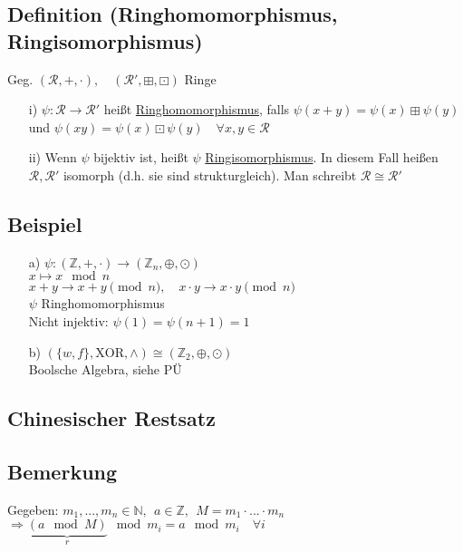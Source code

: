 \documentclass[a4paper, 12pt,titlepage, pdf, headsepline]{article}
\newcommand{\uline}[1]{\underline{#1}}
\renewcommand{\>}{\rightarrow}
\renewcommand{\*}{\cdot}
\begin{document}
	      \subsection{Definition (Ringhomomorphismus, Ringisomorphismus)}
	      Geg. $(\mathcal{R}, + , \cdot),\quad (\mathcal{R}', \boxplus, \boxdot)$  Ringe
	      \begin{itemize}
	      	\item[i)]$\psi: \mathcal{R} \rightarrow \mathcal{R}'$ heißt \uline{Ringhomomorphismus}, falls $\psi(x+y) = \psi(x) \boxplus \psi(y)$ und $\psi(xy)= \psi(x) \boxdot \psi(y)\quad \forall x,y \in \mathcal{R}$
	      	\item[ii)] Wenn $\psi$ bijektiv ist, heißt $\psi$ \uline{Ringisomorphismus}. In diesem Fall heißen $\mathcal{R}, \mathcal{R}'$ isomorph (d.h. sie sind strukturgleich). Man schreibt $\mathcal{R} \cong \mathcal{R}'$
	      \end{itemize}
	      	
	      \subsection{Beispiel}
	      \begin{itemize}
	      	\item[a)] $\psi: (\mathds{Z}, + ,\cdot) \rightarrow (\mathds{Z}_n,\oplus, \odot)$\\
	      	      \noindent\hspace*{17mm}$x \mapsto x \mod n$\\
	      	      $x +y \rightarrow x+y \pmod{n},\quad x \cdot y \rightarrow x \cdot y \pmod{n}$\\
	      	      $\psi$ Ringhomomorphismus\\
	      	      Nicht injektiv: $\psi(1)=\psi(n+1)=1$
	      	\item[b)]  $(\{w,f\}, \text{XOR}, \land) \cong (\mathds{Z}_2, \oplus, \odot)$\\
	      	      Boolsche Algebra, siehe PÜ
	      \end{itemize}
	      \subsection*{Chinesischer Restsatz}
	      \subsection{Bemerkung}
	      \label{4.10}
	      Gegeben: $m_1,...,m_n \in \mathds{N},~~ a \in \mathds{Z},~~ M = m_1 \cdot ... \cdot m_n$ \\
	      \noindent\hspace*{11mm}$\Rightarrow\underbrace{(a \mod M)}_{r} \mod m_i = a \mod m_i \quad\forall i$
\end{document}
